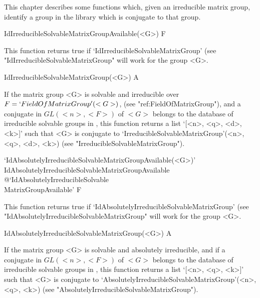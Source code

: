


This chapter describes some functions which, given an irreducible matrix 
group, identify a group in the {\IRREDSOL} library which is conjugate
to that group. 


\>IdIrreducibleSolvableMatrixGroupAvailable(<G>) F

This function returns true if `IdIrreducibleSolvableMatrixGroup' (see
"IdIrreducibleSolvableMatrixGroup" will work for the group <G>.


\>IdIrreducibleSolvableMatrixGroup(<G>) A

If the matrix group <G> is solvable and irreducible over $F
= `FieldOfMatrixGroup'(<G>)$, (see "ref:FieldOfMatrixGroup"), and a conjugate in
$GL(<n>, <F>)$ of $<G>$ belongs to the database of  irreducible solvable groups in
{\IRREDSOL}, this function returns a list `[<n>, <q>, <d>, <k>]' such that <G> is
conjugate to  `IrreducibleSolvableMatrixGroup'(<n>, <q>, <d>, <k>) (see
"IrreducibleSolvableMatrixGroup").



\>`IdAbsolutelyIrreducibleSolvableMatrixGroupAvailable(<G>)'%
{IdAbsolutelyIrreducibleSolvableMatrixGroupAvailable}%
@{`IdAbsolutelyIrreducibleSolvable\\MatrixGroupAvailable'} F

This function returns true if `IdAbsolutelyIrreducibleSolvableMatrixGroup' (see
"IdAbsolutelyIrreducibleSolvableMatrixGroup" will work for the group <G>.


\>IdAbsolutelyIrreducibleSolvableMatrixGroup(<G>) A

If the matrix group <G> is solvable and absolutely irreducible, and if 
 a conjugate in
$GL(<n>, <F>)$ of $<G>$ belongs to the database of  irreducible solvable groups in
{\IRREDSOL}, this function returns a list `[<n>, <q>, <k>]' such that <G> is
conjugate to  `AbsolutelyIrreducibleSolvableMatrixGroup'(<n>, <q>, <k>) (see
"AbsolutelyIrreducibleSolvableMatrixGroup").


